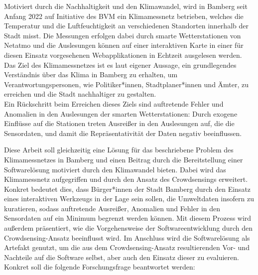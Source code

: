 Motiviert durch die Nachhaltigkeit und den Klimawandel, wird in Bamberg seit Anfang 2022 auf Initiative des \ac{BVM} ein Klimamessnetz betrieben, welches die Temperatur und die Luftfeuchtigkeit an verschiedenen Standorten innerhalb der Stadt misst. Die Messungen erfolgen dabei durch smarte Wetterstationen von Netatmo und die Auslesungen können auf einer interaktiven Karte in einer für diesen Einsatz vorgesehenen Webapplikationen in Echtzeit ausgelesen werden. Das Ziel des Klimamessnetzes ist es laut eigener Aussage, ein grundlegendes Verständnis über das Klima in Bamberg zu erhalten, um Verantwortungspersonen, wie Politiker*innen, Stadtplaner*innen und Ämter, zu erreichen und die Stadt nachhaltiger zu gestalten. \\ Ein Rückschritt beim Erreichen dieses Ziels sind auftretende Fehler und Anomalien in den Auslesungen der smarten Wetterstationen: Durch exogene Einflüsse auf die Stationen treten Ausreißer in den Auslesungen auf, die die Sensordaten, und damit die Repräsentativität der Daten negativ beeinflussen. 

Diese Arbeit soll gleichzeitig eine Lösung für das beschriebene Problem des Klimamessnetzes in Bamberg und einen Beitrag durch die Bereitstellung einer Softwarelösung motiviert durch den Klimawandel bieten. Dabei wird das Klimamessnetz aufgegriffen und durch den Ansatz des Crowdsensings erweitert. Konkret bedeutet dies, dass Bürger*innen der Stadt Bamberg durch den Einsatz eines interaktiven Werkzeugs in der Lage sein sollen, die Umweltdaten insofern zu kuratieren, sodass auftretende Ausreißer, Anomalien und Fehler in den Sensordaten auf ein Minimum begrenzt werden können. Mit diesem Prozess wird außerdem präsentiert, wie die Vorgehensweise der Softwareentwicklung durch den Crowdsensing-Ansatz beeinflusst wird. Im Anschluss wird die Softwarelösung als Artefakt genutzt, um die aus dem Crowdsensing-Ansatz resultierenden Vor- und Nachteile auf die Software selbst, aber auch den Einsatz dieser zu evaluieren. Konkret soll die folgende Forschungsfrage beantwortet werden: 

